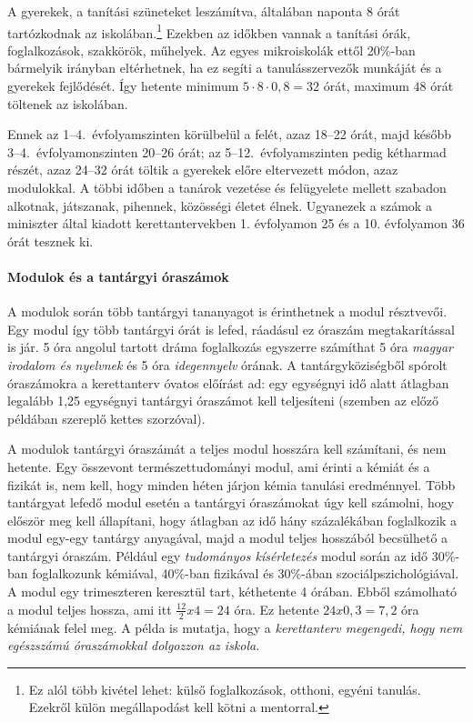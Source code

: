 A gyerekek, a tanítási szüneteket leszámítva, általában naponta 8 órát tartózkodnak az iskolában.\footnote{Ez alól több kivétel lehet: külső foglalkozások, otthoni, egyéni tanulás. Ezekről külön megállapodást kell kötni a mentorral.} Ezekben az időkben vannak a tanítási órák, foglalkozások, szakkörök, műhelyek. Az egyes mikroiskolák ettől 20\%-ban bármelyik irányban eltérhetnek, ha ez segíti a tanulásszervezők munkáját és a gyerekek fejlődését. Így hetente minimum $5 \cdot 8 \cdot 0,8 = 32$ órát, maximum $48$ órát töltenek az iskolában.

Ennek az 1--4.~évfolyamszinten körülbelül a felét, azaz 18--22
órát,\linebreak
majd később 3--4.~évfolyamonszinten 20--26 órát; az 5--12.~évfolyamszinten pedig kétharmad részét, azaz 24--32 órát töltik a gyerekek előre eltervezett módon, azaz modulokkal. A többi időben a tanárok vezetése és felügyelete mellett szabadon alkotnak, játszanak, pihennek, közösségi életet élnek. Ugyanezek a számok a miniszter által kiadott kerettantervekben 1. évfolyamon 25 és a 10. évfolyamon 36 órát tesznek ki.

\paragraph{Modulok és a tantárgyi óraszámok}
A modulok során több tantárgyi tananyagot is érinthetnek a modul résztvevői. Egy modul így több tantárgyi órát is lefed, ráadásul ez óraszám megtakarítással is jár. 5 óra angolul tartott dráma foglalkozás egyszerre számíthat 5 óra \emph{magyar irodalom és nyelvnek} és 5 óra \emph{idegennyelv} órának. A tantárgyköziségből spórolt óraszámokra a kerettanterv óvatos előírást ad: egy egységnyi idő alatt átlagban legalább 1,25 egységnyi tantárgyi óraszámot kell teljesíteni (szemben az előző példában szereplő kettes szorzóval).

A modulok tantárgyi óraszámát a teljes modul hosszára kell számítani, és nem hetente. Egy összevont természettudományi modul, ami érinti a kémiát és a fizikát is, nem kell, hogy minden héten járjon kémia tanulási eredménnyel. Több tantárgyat lefedő modul esetén a tantárgyi óraszámokat úgy kell számolni, hogy először meg kell állapítani, hogy átlagban az idő hány százalékában foglalkozik a modul egy-egy tantárgy anyagával, majd a modul teljes hosszából becsülhető a tantárgyi óraszám. Például egy \emph{tudományos kísérletezés} modul során az idő 30\%-ban foglalkozunk kémiával, 40\%-ban fizikával és 30\%-ában szociálpszichológiával. A modul egy trimeszteren keresztül tart, kéthetente 4 órában. Ebből számolható a modul teljes hossza, ami itt $\frac{12}{2}x4 = 24$ óra. Ez hetente $24x0,3 = 7,2$ óra kémiának felel meg. 
A példa is mutatja, hogy a \emph{kerettanterv megengedi, hogy nem egészszámú óraszámokkal dolgozzon az iskola}. 

